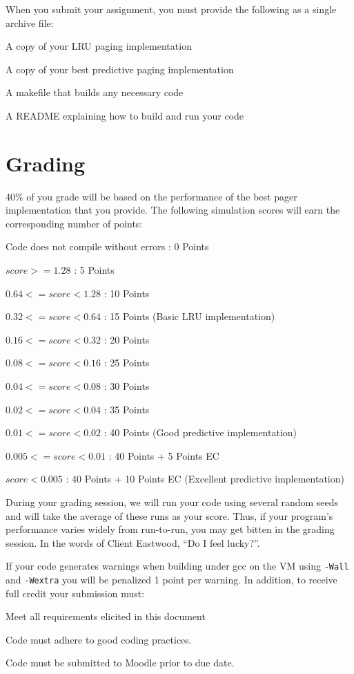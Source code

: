 \documentclass[12pt]{article}
\newenvironment{packed_enum}{
\begin{enumerate}
  \setlength{\itemsep}{1pt}
  \setlength{\parskip}{0pt}
  \setlength{\parsep}{0pt}
}{\end{enumerate}}
\newenvironment{packed_item}{
\begin{itemize}
  \setlength{\itemsep}{1pt}
  \setlength{\parskip}{0pt}
  \setlength{\parsep}{0pt}
}{\end{itemize}}
\begin{document}
When you submit your assignment, you must provide the following as a
single archive file:
\begin{packed_enum}
\item A copy of your LRU paging implementation
\item A copy of your best predictive paging implementation
\item A makefile that builds any necessary code
\item A README explaining how to build and run your code
\end{packed_enum}

\section{Grading}

40\% of you grade will be based on the performance of the
best pager implementation that you provide. The following simulation
scores will earn the corresponding number of points:
\begin{packed_item}
\item Code does not compile without errors : 0 Points
\item $score >= 1.28$ : 5 Points
\item $0.64 <= score < 1.28$ : 10 Points
\item $0.32 <= score < 0.64$ : 15 Points (Basic LRU implementation)
\item $0.16 <= score < 0.32$ : 20 Points
\item $0.08 <= score < 0.16$ : 25 Points
\item $0.04 <= score < 0.08$ : 30 Points
\item $0.02 <= score < 0.04$ : 35 Points
\item $0.01 <= score < 0.02$ : 40 Points (Good predictive implementation)
\item $0.005 <= score < 0.01$ : 40 Points + 5 Points EC
\item $score < 0.005$ : 40 Points + 10 Points EC (Excellent predictive implementation)
\end{packed_item}

During your grading session, we will run your code using several
random seeds and will take the average of these runs as your
score. Thus, if your program's performance varies widely from
run-to-run, you may get bitten in the grading session. In the words of
Client Eastwood, ``Do I feel lucky?''.

If your code generates warnings when building under gcc on the VM
using \texttt{-Wall} and \texttt{-Wextra} you will be penalized 1
point per warning. In addition, to receive full credit your submission must:
\begin{packed_item}
\item Meet all requirements elicited in this document
\item Code must adhere to good coding practices.
\item Code must be submitted to Moodle prior to due date.
\end{packed_item}
\end{document}
